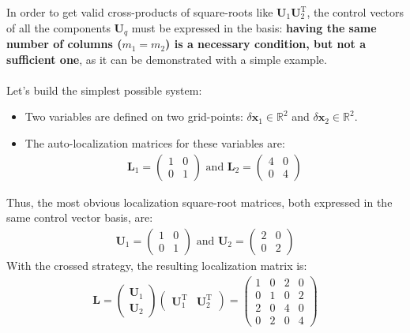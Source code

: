 \documentclass[12pt]{scrartcl}
\begin{document}
In order to get valid cross-products of square-roots like $\mathbf{U}_1 \mathbf{U}_2^\mathrm{T}$, the control vectors of all the components $\mathbf{U}_q$ must be expressed in the basis: \textbf{having the same number of columns ($m_1 = m_2$) is a necessary condition, but not a sufficient one}, as it can be demonstrated with a simple example.\\
$  $\\
Let's build the simplest possible system:
\begin{itemize}
\item Two variables are defined on two grid-points: $\delta \mathbf{x}_1 \in \mathbb{R}^2$ and $\delta \mathbf{x}_2 \in \mathbb{R}^2$.
\item The auto-localization matrices for these variables are:
\begin{align}
\mathbf{L}_1 = \left( \begin{array}{cc}
1 & 0 \\
0 & 1
\end{array} \right) \text{ and } \mathbf{L}_2 = \left( \begin{array}{cc}
4 & 0 \\
0 & 4
\end{array} \right) 
\end{align}
\end{itemize}
Thus, the most obvious localization square-root matrices, both expressed in the same control vector basis, are:
\begin{align}
\mathbf{U}_1 = \left( \begin{array}{cc}
1 & 0 \\
0 & 1
\end{array} \right) \text{ and } \mathbf{U}_2 = \left( \begin{array}{cc}
2 & 0 \\
0 & 2
\end{array} \right) 
\end{align}
With the crossed strategy, the resulting localization matrix is:
\begin{align}
\mathbf{L} = \left( \begin{array}{c}
\mathbf{U}_1 \\
\hline
\mathbf{U}_2
\end{array} \right) \left( \begin{array}{c|c}
\mathbf{U}_1^\mathrm{T} & \mathbf{U}_2^\mathrm{T}
\end{array} \right) = \left( \begin{array}{cc|cc}
1 & 0 & 2 & 0 \\
0 & 1 & 0 & 2 \\
\hline
2 & 0 & 4 & 0 \\
0 & 2 & 0 & 4
\end{array} \right) 
\end{align}
\end{document}
